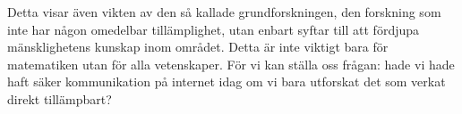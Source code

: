 Detta visar även vikten av den så kallade grundforskningen, den forskning som 
inte har någon omedelbar tillämplighet, utan enbart syftar till att fördjupa 
mänsklighetens kunskap inom området.
Detta är inte viktigt bara för matematiken utan för alla vetenskaper.
För vi kan ställa oss frågan: hade vi hade haft säker kommunikation på internet
idag om vi bara utforskat det som verkat direkt tillämpbart?



%
